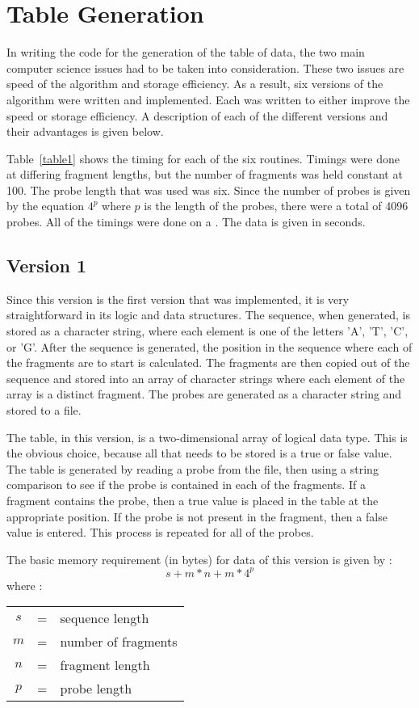 \section{Table Generation}
In writing the code for the generation of the table of data, the
two main computer science issues had to be taken into consideration.  These
two issues are speed of the algorithm and storage efficiency.  As a result,
six versions of the algorithm were written and implemented.  Each was written
to either improve the speed or storage efficiency.  A
description of each of the different versions and their advantages is given
below.

Table~\ref{table1} shows the timing for each of the six
routines.  Timings were done at differing fragment lengths, but the number
of fragments was held constant at 100.  The probe length that was used was
six.  Since the number of probes is given by the equation $4^p$ where $p$
is the length of the probes, there were a total of 4096 probes.  All of the
timings were done on a \achilles.  The data is given in seconds.


\subsection{Version 1}
Since this version is the first version that was implemented, it is
very straightforward in its logic and data structures.  The sequence, when
generated, is stored as a character string, where each element is one of the
letters 'A', 'T', 'C', or 'G'.  After the sequence is generated, the position
in the sequence where each of the fragments are to start is calculated. 
The fragments are then copied out of the sequence and stored into an array
of character strings where each element of the array is a distinct
fragment.  The probes are generated as a character string and stored to a
file.

The table, in this version, is a two-dimensional array of logical data
type.  This is the obvious choice, because all that needs to be stored
is a true or false value.  The table is generated by reading a probe
from the file, then using a string comparison to see if the probe is
contained in each of the fragments.  If a fragment contains the probe, then
a true value is placed in the table at the appropriate position.
If the probe is not present in the fragment, then a false value is
entered.  This process is repeated for all of the probes.

The basic memory requirement (in bytes) for data of this version is given 
by :
\[ s + m*n + m*4^p \]
where :
\begin{center}
\begin{tabular}{ccl}
$s$ & = & sequence length \\
$m$ & = & number of fragments \\
$n$ & = & fragment length \\
$p$ & = & probe length
\end{tabular}
\end{center}

